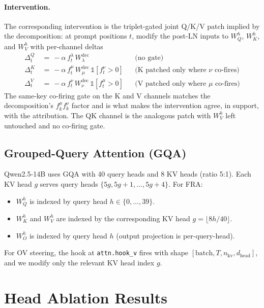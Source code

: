 \documentclass{article}
\theoremstyle{plain}
\theoremstyle{definition}
\theoremstyle{remark}
\newcommand{\Wdec}{W^{\mathrm{dec}}}
\newcommand{\WQ}{W_Q}
\newcommand{\WK}{W_K}
\newcommand{\WV}{W_V}
\newcommand{\WO}{W_O}
\newcommand{\dhead}{d_{\mathrm{head}}}
\begin{document}
\paragraph{Intervention.} The corresponding intervention is the triplet-gated joint Q/K/V patch implied by the decomposition: at prompt positions $t$, modify the post-LN inputs to $\WQ^h$, $\WK^h$, and $\WV^h$ with per-channel deltas
\begin{align*}
    \Delta^Q_t &\,=\, -\alpha\, f_t^\lambda\, \Wdec_\lambda                                    & &\text{(no gate)} \\
    \Delta^K_t &\,=\, -\alpha\, f_t^\mu\, \Wdec_\mu\, \mathbb{1}[f_t^\nu > 0]                  & &\text{(K patched only where $\nu$ co-fires)} \\
    \Delta^V_t &\,=\, -\alpha\, f_t^\nu\, \Wdec_\nu\, \mathbb{1}[f_t^\mu > 0]                  & &\text{(V patched only where $\mu$ co-fires)}
\end{align*}
The same-key co-firing gate on the K and V channels matches the decomposition's $f_k^\mu f_k^\nu$ factor and is what makes the intervention agree, in support, with the attribution. The QK channel is the analogous patch with $\WV^h$ left untouched and no co-firing gate.

\subsection{Grouped-Query Attention (GQA)}
\label{app:gqa}

Qwen2.5-14B uses GQA with 40 query heads and 8 KV heads (ratio 5:1). Each KV head $g$ serves query heads $\{5g, 5g+1, \ldots, 5g+4\}$. For FRA:
\begin{itemize}
    \item $\WQ^h$ is indexed by query head $h \in \{0, \ldots, 39\}$.
    \item $\WK^h$ and $\WV^h$ are indexed by the corresponding KV head $g = \lfloor 8h / 40 \rfloor$.
    \item $\WO^h$ is indexed by query head $h$ (output projection is per-query-head).
\end{itemize}
For OV steering, the hook at \texttt{attn.hook\_v} fires with shape $[\text{batch}, T, n_{\mathrm{kv}}, \dhead]$, and we modify only the relevant KV head index $g$.

\section{Head Ablation Results}
\label{app:head_ablation}
\end{document}

